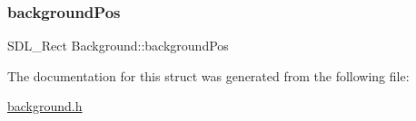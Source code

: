 \mbox{\label{structBackground_a81fdaea521be13c6634186f72b105e33}} 
\subsubsection{\texorpdfstring{background\+Pos}{backgroundPos}}
{\footnotesize\ttfamily S\+D\+L\+\_\+\+Rect Background\+::background\+Pos}



The documentation for this struct was generated from the following file\+:\begin{DoxyCompactItemize}
\item 
\hyperlink{background_8h}{background.\+h}\end{DoxyCompactItemize}
